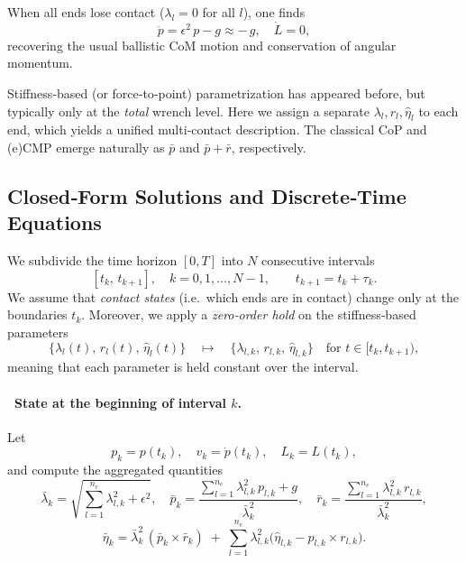 \documentclass[main.tex]{subfiles}
\begin{document}
\begin{remark}
When all ends lose contact ($\lambda_l=0$ for all $l$), one finds
\[
\ddot p = \epsilon^2\,p - g \approx -\,g,
\quad
\dot L = 0,
\]
recovering the usual ballistic CoM motion and conservation of angular momentum.
\end{remark}

\begin{remark}
Stiffness‐based (or force‐to‐point) parametrization has appeared before, but typically only at the \emph{total} wrench level.  Here we assign a separate $\lambda_l,r_l,\hat\eta_l$ to each end, which yields a unified multi‐contact description.  The classical CoP and (e)CMP emerge naturally as $\bar p$ and $\bar p+\bar r$, respectively.
\end{remark}

\subsection{Closed‐Form Solutions and Discrete‐Time Equations}

We subdivide the time horizon $[0,T]$ into $N$ consecutive intervals
\[
[t_k,\,t_{k+1}],\quad k=0,1,\dots,N-1,\qquad
t_{k+1}=t_k+\tau_k.
\]
We assume that \emph{contact states} (i.e.\ which ends are in contact) change only at the boundaries $t_k$.  Moreover, we apply a \emph{zero‐order hold} on the stiffness‐based parameters
\[
\{\lambda_{l}(t),\,r_{l}(t),\,\hat\eta_{l}(t)\}
\quad\mapsto\quad
\{\lambda_{l,k},\,r_{l,k},\,\hat\eta_{l,k}\}
\quad\text{for }t\in[t_k,t_{k+1}),
\]
meaning that each parameter is held constant over the interval.

\medskip
\paragraph{\ State at the beginning of interval $k$.}
Let
\[
p_k = p(t_k),\quad
v_k = \dot p(t_k),\quad
L_k = L(t_k),
\]
and compute the aggregated quantities
\[
\bar\lambda_k
=\sqrt{\sum_{l=1}^{n_e}\lambda_{l,k}^2+\epsilon^2},\quad
\bar p_k
=\frac{\sum_{l=1}^{n_e}\lambda_{l,k}^2\,p_{l,k}+g}{\bar\lambda_k^2},\quad
\bar r_k
=\frac{\sum_{l=1}^{n_e}\lambda_{l,k}^2\,r_{l,k}}{\bar\lambda_k^2},
\]
\[
\bar\eta_k
=\bar\lambda_k^2\,(\bar p_k\times\bar r_k)
\;+\;\sum_{l=1}^{n_e}\lambda_{l,k}^2\bigl(\hat\eta_{l,k}-p_{l,k}\times r_{l,k}\bigr).
\]
\end{document}
